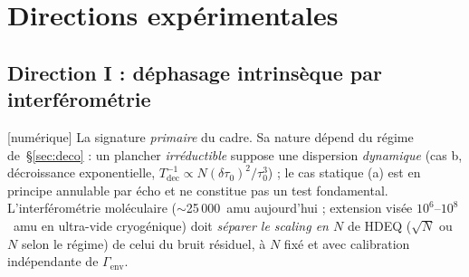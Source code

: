 \documentclass[11pt,a4paper]{article}
\newcommand{\statut}[1]{{\footnotesize\textsf{[#1]}}}
\theoremstyle{plain}
\theoremstyle{definition}
\theoremstyle{remark}
\begin{document}
\section{Directions exp\'erimentales}\label{sec:exp}
\subsection{Direction I : d\'ephasage intrins\`eque par interf\'erom\'etrie}
\statut{num\'erique} La signature \emph{primaire} du cadre. Sa nature d\'epend du r\'egime
de~\S\ref{sec:deco} : un plancher \emph{irr\'eductible} suppose une dispersion
\emph{dynamique} (cas b, d\'ecroissance exponentielle, $T_{\mathrm{dec}}^{-1}\propto
N(\delta\tau_0)^2/\tau_0^3$) ; le cas statique (a) est en principe annulable par \'echo
et ne constitue pas un test fondamental. L'interf\'erom\'etrie mol\'eculaire ($\sim$25\,000~amu
aujourd'hui ; extension vis\'ee $10^6$--$10^8$~amu en ultra-vide cryog\'enique) doit
\emph{s\'eparer le scaling en $N$} de HDEQ ($\sqrt N$ ou $N$ selon le r\'egime) de celui
du bruit r\'esiduel, \`a $N$ fix\'e et avec calibration ind\'ependante de $\Gamma_{\mathrm{env}}$.
\end{document}
